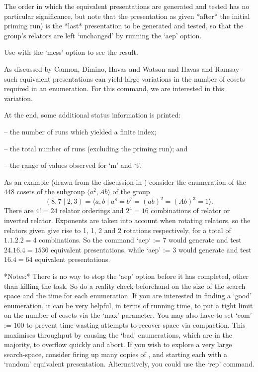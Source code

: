 The  order in  which the  equivalent presentations  are  generated and
tested has no particular  significance, but note that the presentation
as  given *after*  the initial  priming  run) is  the *last*
presentation to be generated and  tested, so that the group's relators
are left `unchanged' by running the `aep' option.

Use  with  the  `mess' option  to  see  the  result. 

As discussed by Cannon, Dimino, Havas and Watson \cite{CDHW} and Havas
and Ramsay  \cite{HR1} such  equivalent presentations can  yield large
variations in  the number of  cosets required in an  enumeration.  For
this command, we are interested in this variation.

At the end, some additional status information is printed: 


\beginlist
\item{--}  the number of runs which yielded a finite index; 
\item{--}  the total number of runs (excluding the priming run); and 
\item{--}  the range of values observed for `m' and `t'.
\endlist


As an example (drawn from the discussion in \cite{HR99a}) consider the enumeration of the $448$ cosets of the subgroup $\langle a^2,Ab \rangle$ of the group
     $$ (8,7 \mid 2,3) 
    = \langle a,b \mid a^8 = b^7 = (ab)^2 = (Ab)^3 = 1 \rangle . $$
There are $4!=24$ relator orderings and $2^4=16$ combinations of relator or
inverted relator.
Exponents are taken into account when rotating relators, so the relators
given give rise to 1, 1, 2 and 2 rotations respectively, for a total
of $1.1.2.2=4$ combinations.
So the command `aep` := $7$ would generate and test $24.16.4=1536$ 
equivalent presentations, while `aep' := $3$ would generate and test 
$16.4=64$ equivalent presentations.

*Notes:*
There is  no way  to stop  the `aep' option  before it  has completed,
other than killing the task.  So  do a reality check beforehand on the
size of  the search space and  the time for each  enumeration.  If you
are  interested  in finding  a  `good'  enumeration,  it can  be  very
helpful, in terms of running time,  to put a tight limit on the number
of cosets via the `max' parameter.
You may also have to set `com' := $100$ to prevent time-wasting attempts
to recover space via compaction.
This maximises throughput by causing the `bad' enumerations, which are in
the majority, to overflow quickly and abort.
If you wish to explore a very large search-space, consider firing up many
copies of {\ACE}, and starting each with a `random' equivalent
presentation.
Alternatively, you could use the `rep' command.

